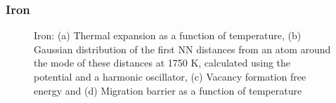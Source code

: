 \documentclass{article}
\begin{document}
\subsubsection{Iron}

\begin{figure}[!htp]
\centering
{}
\hfill
{}
\hfill
\caption{Iron: (a) Thermal expansion as a function of temperature, (b) Gaussian distribution of the first NN distances from an atom around the mode of these distances at 1750 K, calculated using the potential \cite{Ackland1997} and a harmonic oscillator, (c) Vacancy formation free energy and (d) Migration barrier as a function of temperature}
\label{fig:15}
\end{figure}
\end{document}

